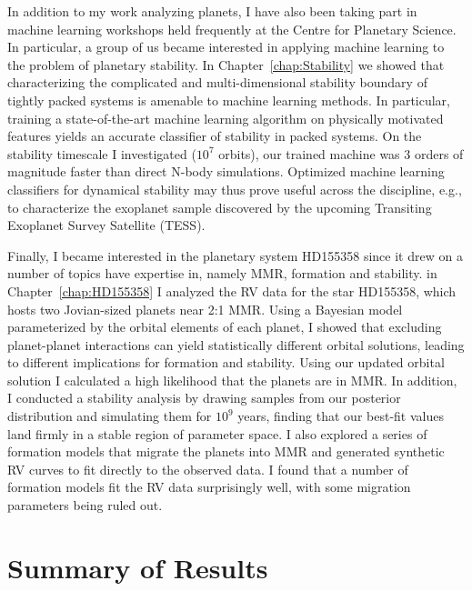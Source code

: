 In addition to my work analyzing \kep planets, I have also been taking part in machine learning workshops held frequently at the Centre for Planetary Science. 
In particular, a group of us became interested in applying machine learning to the problem of planetary stability. 
In Chapter~\ref{chap:Stability} we showed that characterizing the complicated and multi-dimensional stability boundary of tightly packed systems is amenable to machine learning methods. 
In particular, training a state-of-the-art machine learning algorithm on physically motivated features yields an accurate classifier of stability in packed systems. 
On the stability timescale I investigated ($10^7$ orbits), our trained machine was 3 orders of magnitude faster than direct N-body simulations. 
Optimized machine learning classifiers for dynamical stability may thus prove useful across the discipline, e.g., to characterize the exoplanet sample discovered by the upcoming Transiting Exoplanet Survey Satellite (TESS).

Finally, I became interested in the planetary system HD155358 since it drew on a number of topics have expertise in, namely MMR, formation and stability. 
in Chapter~\ref{chap:HD155358} I analyzed the RV data for the star HD155358, which hosts two Jovian-sized planets near 2:1 MMR. 
Using a Bayesian model parameterized by the orbital elements of each planet, I showed that excluding planet-planet interactions can yield statistically different orbital solutions, leading to different implications for formation and stability. 
Using our updated orbital solution I calculated a high likelihood that the planets are in MMR. 
In addition, I conducted a stability analysis by drawing samples from our posterior distribution and simulating them for $10^9$ years, finding that our best-fit values land firmly in a stable region of parameter space.
I also explored a series of formation models that migrate the planets into MMR and generated synthetic RV curves to fit directly to the observed data. 
I found that a number of formation models fit the RV data surprisingly well, with some migration parameters being ruled out.

\section{Summary of Results}
